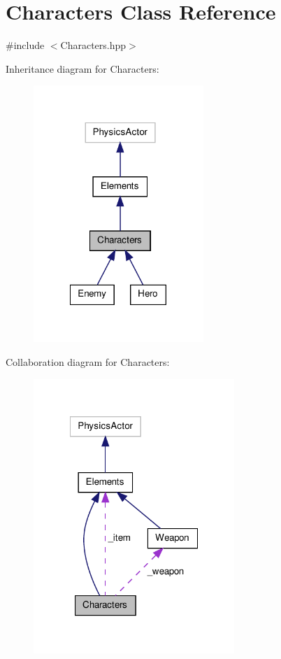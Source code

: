 \hypertarget{class_characters}{\section{Characters Class Reference}
\label{class_characters}
}


{\ttfamily \#include $<$Characters.\-hpp$>$}



Inheritance diagram for Characters\-:\nopagebreak
\begin{figure}[H]
\begin{center}
\leavevmode
\includegraphics[width=182pt]{class_characters__inherit__graph}
\end{center}
\end{figure}


Collaboration diagram for Characters\-:\nopagebreak
\begin{figure}[H]
\begin{center}
\leavevmode
\includegraphics[width=215pt]{class_characters__coll__graph}
\end{center}
\end{figure}
